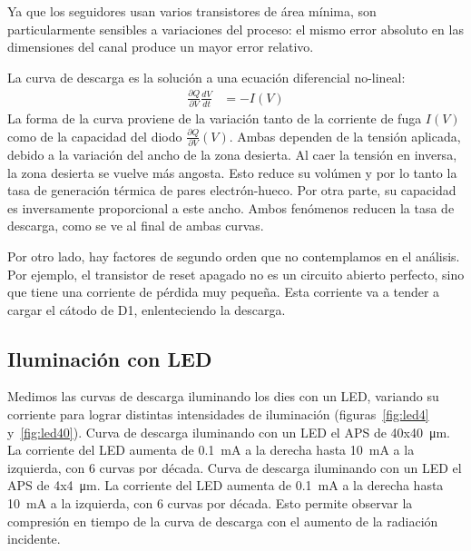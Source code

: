 Ya que los seguidores usan varios transistores de área mínima,
son particularmente sensibles a variaciones del proceso:
el mismo error absoluto en las dimensiones del canal produce un mayor error relativo.


La curva de descarga es la solución a una ecuación diferencial
no-lineal:
\begin{align*}
    \frac{\partial Q}{\partial V}\frac{dV}{dt} &= -I(V)
\end{align*}
La forma de la curva proviene de la variación 
tanto de la corriente de fuga $I(V)$ 
como de la capacidad del diodo $\frac{\partial Q}{\partial V}(V)$.
Ambas dependen de la tensión aplicada,
debido a la variación del ancho de la zona desierta.
Al caer la tensión en inversa,
la zona desierta se vuelve más angosta.
Esto reduce su volúmen y por lo tanto 
la tasa de generación térmica de pares electrón-hueco.
Por otra parte,
su capacidad es inversamente proporcional a este ancho.
Ambos fenómenos reducen la tasa de descarga,
como se ve al final de ambas curvas.

Por otro lado, hay factores de segundo orden 
que no contemplamos en el análisis.
Por ejemplo, el transistor de reset apagado
no es un circuito abierto perfecto, 
sino que tiene una corriente de pérdida muy pequeña.
Esta corriente va a tender a cargar el cátodo de D1,
enlenteciendo la descarga.
%
\subsection{Iluminación con LED}
Medimos las curvas de descarga iluminando los dies con un LED,
variando su corriente para lograr distintas intensidades de iluminación
(figuras~\ref{fig:led4} y~\ref{fig:led40}).
{Curva de descarga iluminando con un LED el APS de 40x\SI{40}{\micro\meter}.
La corriente del LED aumenta de \SI{.1}{\milli\ampere} a la derecha hasta
\SI{10}{\milli\ampere} a la izquierda,
con 6 curvas por década.}
{Curva de descarga iluminando con un LED el APS de 4x\SI{4}{\micro\meter}.
La corriente del LED aumenta de \SI{.1}{\milli\ampere} a la derecha hasta
\SI{10}{\milli\ampere} a la izquierda,
con 6 curvas por década.}
Esto permite observar la compresión en tiempo de la curva de descarga 
con el aumento de la radiación incidente.
